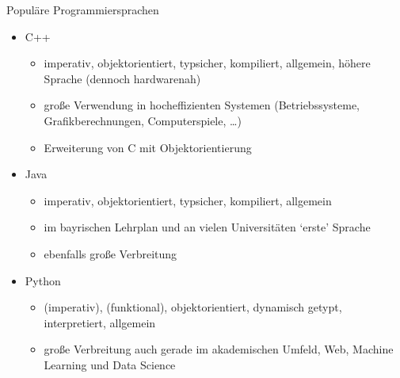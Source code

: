 \begin{frame}{Populäre Programmiersprachen}
    \begin{itemize}
        \item C++
            \begin{itemize}
                \item imperativ, objektorientiert, typsicher, kompiliert, allgemein,
                höhere Sprache (dennoch hardwarenah)
                \item große Verwendung in hocheffizienten Systemen 
                (Betriebssysteme, Grafikberechnungen, Computerspiele, \dots)
                \item Erweiterung von C mit Objektorientierung
            \end{itemize}
        \item Java
            \begin{itemize}
                \item imperativ, objektorientiert, typsicher, kompiliert, allgemein
                \item im bayrischen Lehrplan und an vielen Universitäten 
                `erste' Sprache
                \item ebenfalls große Verbreitung
            \end{itemize}
        \item Python
            \begin{itemize}
                \item (imperativ), (funktional), objektorientiert, 
                dynamisch getypt, interpretiert, allgemein
                \item große Verbreitung auch gerade im akademischen Umfeld, 
                Web, Machine Learning und Data Science
            \end{itemize}
    \end{itemize}
\end{frame}

